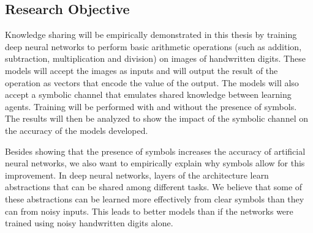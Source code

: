 \subsection{Research Objective} \label{sec:introduction-research-objective-scope-research-objective}

Knowledge sharing will be empirically demonstrated in this thesis by training deep neural networks to perform basic arithmetic operations (such as addition, subtraction, multiplication and division) on images of handwritten digits. These models will accept the images as inputs and will output the result of the operation as vectors that encode the value of the output. The models will also accept a symbolic channel that emulates shared knowledge between learning agents. Training will be performed with and without the presence of symbols. The results will then be analyzed to show the impact of the symbolic channel on the accuracy of the models developed.

Besides showing that the presence of symbols increases the accuracy of artificial neural networks, we also want to empirically explain why symbols allow for this improvement. In deep neural networks, layers of the architecture learn abstractions that can be shared among different tasks\cite{Bengio:2009:LDA:1658423.1658424}. We believe that some of these abstractions can be learned more effectively from clear symbols than they can from noisy inputs. This leads to better models than if the networks were trained using noisy handwritten digits alone.